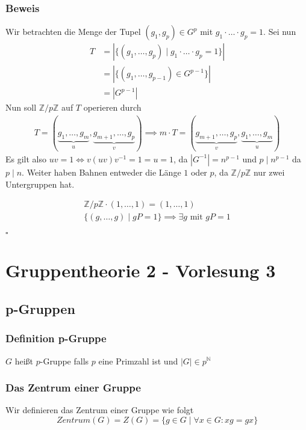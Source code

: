 \documentclass[12pt, german]{article}
\newcommand{\bewiesen}{
	
	\begin{flushright}
		$\square$  \\
\end{flushright}}
\begin{document}
	\subsubsection{Beweis}
	Wir betrachten die Menge der Tupel $(g_1, g_p) \in G^p$ mit $g_1 \cdot \ldots \cdot g_p = 1$. 
	Sei nun 
	\begin{align*}
		T &= |\{(g_1, \ldots, g_p) \mid  g_1 \cdot \ldots \cdot g_p = 1 \}| \\
		&= |\{(g_1, \ldots, g_{p-1}) \in G^{p-1} \}| \\
		&= |G^{p-1}|
	\end{align*}
	Nun soll $\mathbb Z /p\mathbb Z$ auf $T$ operieren durch
	\begin{align*}
		T = (\underbrace{g_1, \ldots, g_m}_{\substack{u}}, \underbrace{g_{m+1}, \ldots, g_p}_{\substack{v}}) \implies m\cdot T = (\underbrace{g_{m+1}, \ldots, g_p}_{\substack{v}}, \underbrace{g_1, \ldots, g_m}_{\substack{u}})
	\end{align*}
	Es gilt also $uv = 1 \iff v(uv)v^{-1} = 1 = u = 1$, da $|G^{-1}| = n^{p-1}$ und $p \mid n^{p-1} $ da $p \mid n$.
	Weiter haben Bahnen entweder die Länge $1$ oder $p$, da $\mathbb Z /p\mathbb Z$ nur zwei Untergruppen hat.
	
	\begin{align*}
		\mathbb Z /p\mathbb Z \cdot (1, \ldots, 1) = (1, \ldots, 1) \\
		\{(g, \ldots, g) \mid gP= 1 \} \implies \exists g \text{ mit } gP = 1
	\end{align*}
	\bewiesen
	
	\section{Gruppentheorie 2 - Vorlesung 3}
	\subsection{p-Gruppen}
	\subsubsection{Definition p-Gruppe}
	$G$ heißt $p$-Gruppe falls $p$ eine Primzahl ist und $|G| \in p^{\mathbb N}$
	
	\subsubsection{Das Zentrum einer Gruppe}
	Wir definieren das Zentrum einer Gruppe wie folgt $$Zentrum(G)= Z(G) = \{g \in G \mid  \forall x \in G: xg = gx\}$$
	
\end{document}

